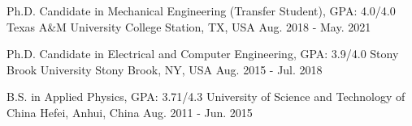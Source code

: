 

\begin{cventries}

  \cventry
    {Ph.D. Candidate in Mechanical Engineering (Transfer Student), GPA: 4.0/4.0} %
    {Texas A\&M University} %
    {College Station, TX, USA} %
    {Aug. 2018 - May. 2021} %
    {}

  \cventry
    {Ph.D. Candidate in Electrical and Computer Engineering, GPA: 3.9/4.0} %
    {Stony Brook University} %
    {Stony Brook, NY, USA} %
    {Aug. 2015 - Jul. 2018} %
    {}

  \cventry
    {B.S. in Applied Physics, GPA: 3.71/4.3} %
    {University of Science and Technology of China} %
    {Hefei, Anhui, China} %
    {Aug. 2011 - Jun. 2015} %
    {}

\end{cventries}
